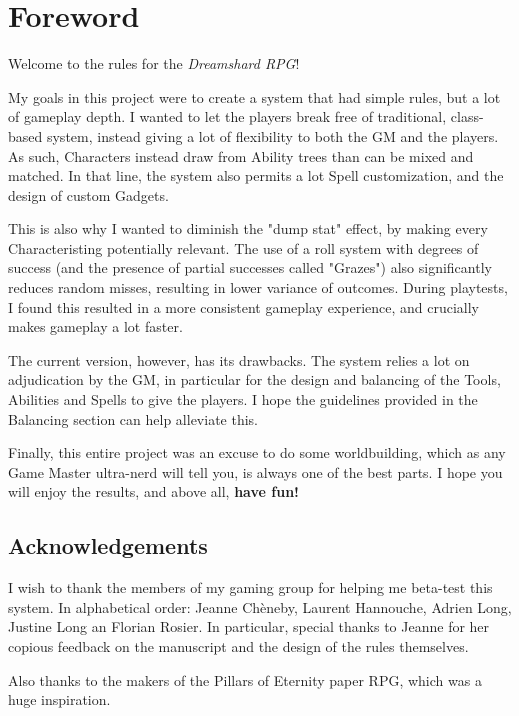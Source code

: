 \chapter*{Foreword}

Welcome to the rules for the \textit{Dreamshard RPG}!

My goals in this project were to create a system that had simple rules, but a lot of gameplay depth. I wanted to let the players break free of traditional, class-based system, instead giving a lot of flexibility to both the GM and the players. As such, Characters instead draw from Ability trees than can be mixed and matched. In that line, the system also permits a lot Spell customization, and the design of custom Gadgets. 

This is also why I wanted to diminish the "dump stat" effect, by making every Characteristing potentially relevant. The use of a roll system with degrees of success (and the presence of partial successes called "Grazes") also significantly reduces random misses, resulting in lower variance of outcomes. During playtests, I found this resulted in a more consistent gameplay experience, and crucially makes gameplay a lot faster.

The current version, however, has its drawbacks. The system relies a lot on adjudication by the GM, in particular for the design and balancing of the Tools, Abilities and Spells to give the players. I hope the guidelines provided in the Balancing section can help alleviate this.

Finally, this entire project was an excuse to do some worldbuilding, which as any Game Master ultra-nerd will tell you, is always one of the best parts. I hope you will enjoy the results, and above all, \textbf{have fun!}



\section*{Acknowledgements}

I wish to thank the members of my gaming group for helping me beta-test this system. In alphabetical order: Jeanne Chèneby, Laurent Hannouche, Adrien Long, Justine Long an Florian Rosier. In particular, special thanks to Jeanne for her copious feedback on the manuscript and the design of the rules themselves.

Also thanks to the makers of the Pillars of Eternity paper RPG, which was a huge inspiration.

